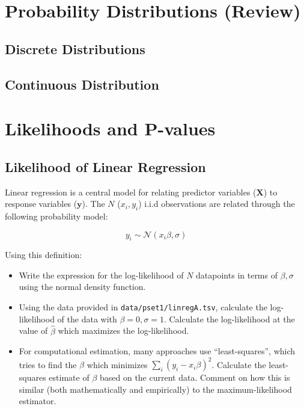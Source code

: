 \documentclass{pset}
\date{6/1/2025}
\begin{document}
\maketitle

\section*{Probability Distributions (Review)}


\subsection*{Discrete Distributions}




\subsection*{Continuous Distribution}




\section*{Likelihoods and P-values}

\subsection*{Likelihood of Linear Regression}

Linear regression is a central model for relating predictor variables ($\mathbf{X}$) to response variables ($\mathbf{y}$). The $N$ ($x_i, y_i$) i.i.d observations are related through the following probability model: 

$$y_i \sim \mathcal{N}(x_i\beta, \sigma)$$ 

Using this definition:

\begin{itemize}
\item Write the expression for the log-likelihood of $N$ datapoints in terms of $\beta,\sigma$ using the normal density function.
\item Using the data provided in \texttt{data/pset1/linregA.tsv}, calculate the log-likelihood of the data with $\beta = 0,\sigma=1$. Calculate the log-likelihood at the value of $\hat{\beta}$ which maximizes the log-likelihood. 
\item For computational estimation, many approaches use ``least-squares'', which tries to find the $\beta$ which minimizes $\sum_i (y_i - x_i\beta)^2$. Calculate the least-squares estimate of $\beta$ based on the current data. Comment on how this is similar (both mathematically and empirically) to the maximum-likelihood estimator.
\end{itemize}
\end{document}
